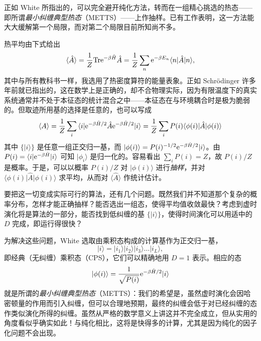 \documentclass[a4paper,10pt,oneside,onecolumn,1p,times]{elsarticle}
\newcommand{\tr}{{\rm Tr }}
\newcommand{\eul}{{\rm e }}
\newcommand{\bra}[1]{\mbox{$\langle #1  |$}}
\newcommand{\ket}[1]{\mbox{$| #1  \rangle$}}
\begin{document}
正如 White \cite{Stoudenmire10,White09} 所指出的，可以完全避开纯化方法，转而在一组精心挑选的热态——即所谓{\em 最小纠缠典型热态}（METTS）——上作抽样。已有工作表明，这一方法能大大缓解第一个局限，而对第二个局限目前所知尚不多。

热平均由下式给出
\begin{equation}
\langle \hat{A} \rangle = \frac{1}{Z} \tr \eul^{-\beta \hat{H}} \hat{A} = \frac{1}{Z} \sum_n \eul^{-\beta E_n} \bra{n} \hat{A} \ket{n} ,
\end{equation}
其中与所有教科书一样，我选用了热密度算符的能量表象。正如 Schr\"{o}dinger 许多年前就已指出的，这在数学上是正确的，却不合物理实际，因为有限温度下的真实系统通常并不处于本征态的统计混合之中——本征态在与环境耦合时是极为脆弱的。但取迹所用基的选择是任意的，也可以写成
\begin{equation}
\langle A \rangle = \frac{1}{Z} \sum_i \bra{i} \eul^{-\beta\hat{H}/2} \hat{A} \eul^{-\beta\hat{H}/2} \ket{i}
= \frac{1}{Z} \sum_i P(i) \bra{\phi(i)} \hat{A} \ket{\phi(i)}
\end{equation}
其中 $\{ \ket{i} \}$ 是任意一组正交归一基，而 $\ket{\phi(i)} = P(i)^{-1/2} \eul^{-\beta\hat{H}/2} \ket{i}$。由 $P(i) = \bra{i} \eul^{-\beta \hat{H}} \ket{i}$ 可知 $\ket{\phi_{i}}$ 是归一化的。容易看出 $\sum_i P(i) = Z$，故 $P(i)/Z$ 是概率。于是，可以以概率 $P(i)/Z$ 对 $\ket{\phi(i)}$ 进行{\em 抽样}，并对 $\bra{\phi(i)} \hat{A} \ket{\phi(i)}$ 求平均，从而对 $\langle \hat{A}\rangle$ 作统计估计。

要把这一切变成实际可行的算法，还有几个问题。既然我们并不知道那个复杂的概率分布，怎样才能正确抽样？能否选出一组态，使得平均值收敛最快？考虑到虚时演化将是算法的一部分，能否找到低纠缠的基 $\{ \ket{i} \}$，使得时间演化可以用适中的 $D$ 完成，即运行得很快？

为解决这些问题，White 选取由乘积态构成的计算基作为正交归一基，
\begin{equation}
\ket{i} = \ket{i_1}\ket{i_2}\ket{i_3} \ldots \ket{i_L} ,
\end{equation}
即经典（无纠缠）乘积态（CPS），它们可以精确地用 $D=1$ 表示。相应的态
\begin{equation}
\ket{\phi(i)} = \frac{1}{\sqrt{P(i)}} \eul^{-\beta \hat{H}/2} \ket{i}
\end{equation}
就是所谓的{\em 最小纠缠典型热态}（METTS）：我们的希望是，虽然虚时演化会因哈密顿量的作用而引入纠缠，但可以合理地预期，最终的纠缠会低于对已经纠缠的态作类似演化所得的纠缠。虽然从严格的数学意义上讲这并不完全成立，但从实用的角度看似乎确实如此！与纯化相比，这将是快得多的计算，尤其是因为纯化的因子化问题不会出现。
\end{document}
